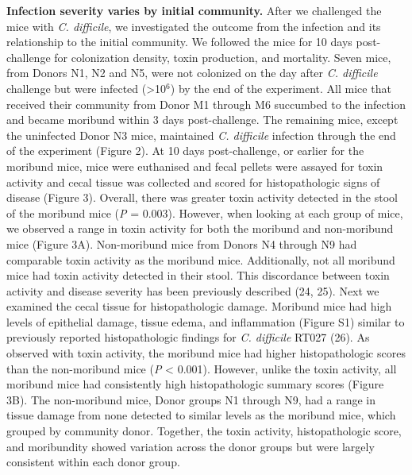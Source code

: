 \documentclass[
  12pt,
]{article}
\begin{document}
\textbf{Infection severity varies by initial community.} After we
challenged the mice with \emph{C. difficile}, we investigated the
outcome from the infection and its relationship to the initial
community. We followed the mice for 10 days post-challenge for
colonization density, toxin production, and mortality. Seven mice, from
Donors N1, N2 and N5, were not colonized on the day after \emph{C.
difficile} challenge but were infected (\textgreater10\(^{6}\)) by the
end of the experiment. All mice that received their community from Donor
M1 through M6 succumbed to the infection and became moribund within 3
days post-challenge. The remaining mice, except the uninfected Donor N3
mice, maintained \emph{C. difficile} infection through the end of the
experiment (Figure 2). At 10 days post-challenge, or earlier for the
moribund mice, mice were euthanised and fecal pellets were assayed for
toxin activity and cecal tissue was collected and scored for
histopathologic signs of disease (Figure 3). Overall, there was greater
toxin activity detected in the stool of the moribund mice (\emph{P} =
0.003). However, when looking at each group of mice, we observed a range
in toxin activity for both the moribund and non-moribund mice (Figure
3A). Non-moribund mice from Donors N4 through N9 had comparable toxin
activity as the moribund mice. Additionally, not all moribund mice had
toxin activity detected in their stool. This discordance between toxin
activity and disease severity has been previously described (24, 25).
Next we examined the cecal tissue for histopathologic damage. Moribund
mice had high levels of epithelial damage, tissue edema, and
inflammation (Figure S1) similar to previously reported histopathologic
findings for \emph{C. difficile} RT027 (26). As observed with toxin
activity, the moribund mice had higher histopathologic scores than the
non-moribund mice (\emph{P} \textless{} 0.001). However, unlike the
toxin activity, all moribund mice had consistently high histopathologic
summary scores (Figure 3B). The non-moribund mice, Donor groups N1
through N9, had a range in tissue damage from none detected to similar
levels as the moribund mice, which grouped by community donor. Together,
the toxin activity, histopathologic score, and moribundity showed
variation across the donor groups but were largely consistent within
each donor group.
\end{document}
